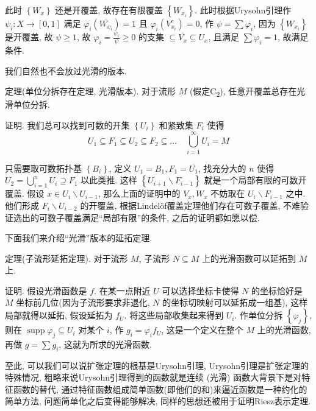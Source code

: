 \documentclass[options]{article}
\begin{document}
此时 $\left\{W_x\right\}$ 还是开覆盖, 故存在有限覆盖 $\left\{W_{x_i}\right\}$. 此时根据Urysohn引理作 $\psi_i: X \rightarrow[0,1]$ 满足 $\varphi_i\left(\overline{W_{x_i}}\right)=1$ 且 $\varphi_i\left(V_{x_i}^c\right)=0$, 作 $\psi=\sum \varphi_i$, 因为 $\left\{W_{x_i}\right\}$ 是开覆盖, 故 $\psi \geq 1$, 故 $\varphi_i=\frac{\psi_i}{\psi} \geq 0$ 的支集 $\subseteq \overline{V_x} \subseteq U_x$, 且满足 $\sum \varphi_i=1$, 故满足条件.

\begin{remark}
	我们自然也不会放过光滑的版本.

	\hrulefill

	定理(单位分拆存在定理, 光滑版本). 对于流形 $M$ (假定C\textsubscript{2}), 任意开覆盖总存在光滑单位分拆.
\end{remark}
证明. 我们总可以找到可数的开集 $\left\{U_i\right\}$ 和紧致集 $F_i$ 使得
\[
		U_1 \subseteq F_1 \subseteq U_2 \subseteq F_2 \subseteq \ldots \quad \bigcup_{i=1}^{\infty} U_i=M
\]

只需要取可数拓扑基 $\left\{B_i\right\}$, 定义 $U_1=B_1, F_1=\overline{U_1}$, 找充分大的 $n$ 使得 $U_2=\bigcup_{i=1}^n U_i \supseteq F_1$ 以此类推. 这样 $\left\{U_{i+1} \backslash F_{i-1}\right\}$ 就是一个局部有限的可数开覆盖. 假设 $x \in U_i \backslash U_{i-1}$, 那么上面的证明中的 $V_x, W_x$ 不妨取在 $U_i \backslash F_{i-1}$ 之中. 他们形成 $F_i \backslash U_{i-2}$ 的开覆盖, 根据Lindelöf覆盖定理他们存在可数子覆盖, 不难验证选出的可数子覆盖满足“局部有限”的条件, 之后的证明都如愿以偿.

\begin{remark}
	下面我们来介绍“光滑”版本的延拓定理.

	\hrulefill

	定理(子流形延拓定理). 对于流形 $M$, 子流形 $N \subseteq M$ 上的光滑函数可以延拓到 $M$ 上.
\end{remark}
证明. 假设光滑函数是 $f$. 在某一点附近 $U$ 可以选择坐标卡使得 $N$ 的坐标恰好是 $M$ 坐标前几位(因为子流形要求非退化, $N$ 的坐标切映射可以延拓成一组基), 这样局部就得以延拓, 假设延拓为 $f_U$. 将这些局部收集起来得到 $U_i$. 作单位分拆 $\left\{\varphi_j\right\}$, 则在 $\operatorname{supp} \varphi_j \subseteq U_i$ 对某个 $i$, 作 $g_i=\varphi_i f_U$, 这是一个定义在整个 $M$ 上的光滑函数, 再做 $g=\sum g_i$, 这就为所求的光滑函数.

至此, 可以我们可以说扩张定理的根基是Urysohn引理, Urysohn引理是扩张定理的特殊情况, 粗略来说Urysohn引理得到的函数就是连续 (光滑) 函数大背景下是对特征函数的替代, 通过特征函数组成简单函数(即他们的和)来逼近函数是一种约化的简单方法, 问题简单化之后变得能够解决, 同样的思想还被用于证明Riesz表示定理.
\end{document}
